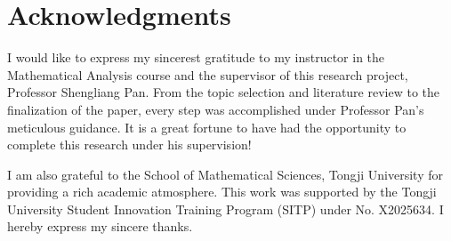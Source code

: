 \documentclass[a4paper,fleqn,numbers]{cas-sc}
\begin{document}
	\section{Acknowledgments}
	
	I would like to express my sincerest gratitude to my instructor in the Mathematical Analysis course and the supervisor of this research project, Professor Shengliang Pan. From the topic selection and literature review to the finalization of the paper, every step was accomplished under Professor Pan's meticulous guidance. It is a great fortune to have had the opportunity to complete this research under his supervision!
	
	I am also grateful to the School of Mathematical Sciences, Tongji University for providing a rich academic atmosphere. This work was supported by the Tongji University Student Innovation Training Program (SITP) under No. X2025634. I hereby express my sincere thanks.
	
	
	
	
	
	
	
	
	
	
\end{document}
